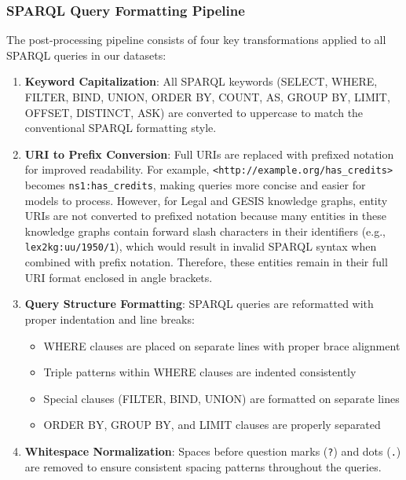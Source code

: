 \subsubsection{SPARQL Query Formatting Pipeline}

The post-processing pipeline consists of four key transformations applied to all SPARQL queries in our datasets:

\begin{enumerate}
    \item \textbf{Keyword Capitalization}: All SPARQL keywords (SELECT, WHERE, FILTER, BIND, UNION, ORDER BY, COUNT, AS, GROUP BY, LIMIT, OFFSET, DISTINCT, ASK) are converted to uppercase to match the conventional SPARQL formatting style.
    
    \item \textbf{URI to Prefix Conversion}: Full URIs are replaced with prefixed notation for improved readability. For example, \texttt{<http://example.org/has\_credits>} becomes \texttt{ns1:has\_credits}, making queries more concise and easier for models to process. However, for Legal and GESIS knowledge graphs, entity URIs are not converted to prefixed notation because many entities in these knowledge graphs contain forward slash characters in their identifiers (e.g., \texttt{lex2kg:uu/1950/1}), which would result in invalid SPARQL syntax when combined with prefix notation. Therefore, these entities remain in their full URI format enclosed in angle brackets.
    
    \item \textbf{Query Structure Formatting}: SPARQL queries are reformatted with proper indentation and line breaks:
    \begin{itemize}
        \item WHERE clauses are placed on separate lines with proper brace alignment
        \item Triple patterns within WHERE clauses are indented consistently
        \item Special clauses (FILTER, BIND, UNION) are formatted on separate lines
        \item ORDER BY, GROUP BY, and LIMIT clauses are properly separated
    \end{itemize}
    
    \item \textbf{Whitespace Normalization}: Spaces before question marks (\texttt{?}) and dots (\texttt{.}) are removed to ensure consistent spacing patterns throughout the queries.
\end{enumerate}

